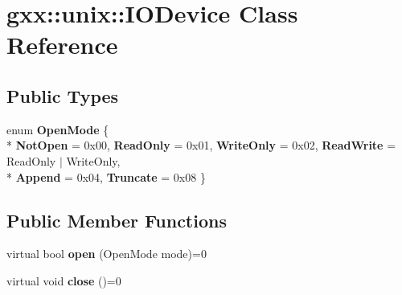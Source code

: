 \hypertarget{classgxx_1_1unix_1_1IODevice}{}\section{gxx\+:\+:unix\+:\+:I\+O\+Device Class Reference}
\label{classgxx_1_1unix_1_1IODevice}
\subsection*{Public Types}
\begin{DoxyCompactItemize}
\item 
enum {\bfseries Open\+Mode} \{ \\*
{\bfseries Not\+Open} = 0x00, 
{\bfseries Read\+Only} = 0x01, 
{\bfseries Write\+Only} = 0x02, 
{\bfseries Read\+Write} = Read\+Only $\vert$ Write\+Only, 
\\*
{\bfseries Append} = 0x04, 
{\bfseries Truncate} = 0x08
 \}\hypertarget{classgxx_1_1unix_1_1IODevice_aee2556829b9b49ab740b898c01c57a48}{}\label{classgxx_1_1unix_1_1IODevice_aee2556829b9b49ab740b898c01c57a48}

\end{DoxyCompactItemize}
\subsection*{Public Member Functions}
\begin{DoxyCompactItemize}
\item 
virtual bool {\bfseries open} (Open\+Mode mode)=0\hypertarget{classgxx_1_1unix_1_1IODevice_a31f0d25ea195a8c1556a310cbc8d0708}{}\label{classgxx_1_1unix_1_1IODevice_a31f0d25ea195a8c1556a310cbc8d0708}

\item 
virtual void {\bfseries close} ()=0\hypertarget{classgxx_1_1unix_1_1IODevice_a5d96ce17697244e401e56d2a8c8a2d30}{}\label{classgxx_1_1unix_1_1IODevice_a5d96ce17697244e401e56d2a8c8a2d30}

\end{DoxyCompactItemize}
